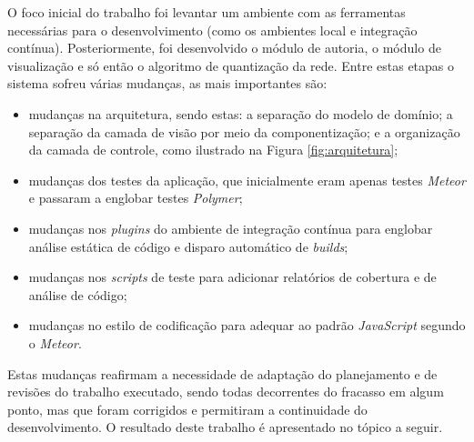 O foco inicial do trabalho foi levantar um ambiente com as ferramentas necessárias para o desenvolvimento (como os ambientes local e integração contínua). Posteriormente, foi desenvolvido o módulo de autoria, o  módulo de visualização e só então o algoritmo de quantização da rede. Entre estas etapas o sistema sofreu várias mudanças, as mais importantes são: 
\begin{itemize}
	\item mudanças na arquitetura, sendo estas: a separação do modelo de domínio; a separação da camada de visão por meio da componentização; e a organização da camada de controle, como ilustrado na Figura \ref{fig:arquitetura};
	\item mudanças dos testes da aplicação, que inicialmente eram apenas testes \textit{Meteor} e passaram a englobar testes \textit{Polymer};
	\item mudanças nos \textit{plugins} do ambiente de integração contínua para englobar análise estática de código e disparo automático de \textit{builds};
	\item mudanças nos \textit{scripts} de teste para adicionar relatórios de cobertura e de análise de código;
	\item mudanças no estilo de codificação para adequar ao padrão \textit{JavaScript} segundo o \textit{Meteor}.
\end{itemize}

Estas mudanças reafirmam a necessidade de adaptação do planejamento e de revisões do trabalho executado, sendo todas decorrentes do fracasso em algum ponto, mas que foram corrigidos e permitiram a continuidade do desenvolvimento. O resultado deste trabalho é apresentado no tópico a seguir.
